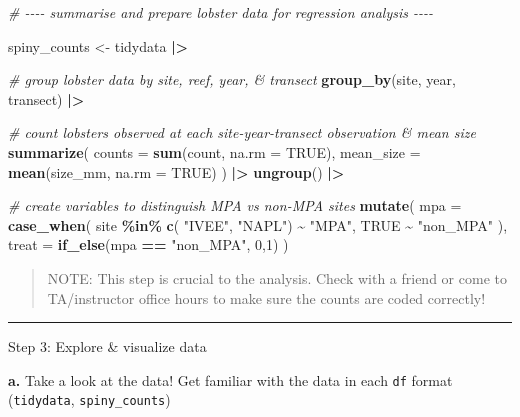 \documentclass[
]{article}
\newenvironment{Shaded}{\begin{snugshade}}{\end{snugshade}}
\newcommand{\AttributeTok}[1]{\textcolor[rgb]{0.13,0.29,0.53}{#1}}
\newcommand{\CommentTok}[1]{\textcolor[rgb]{0.56,0.35,0.01}{\textit{#1}}}
\newcommand{\ConstantTok}[1]{\textcolor[rgb]{0.56,0.35,0.01}{#1}}
\newcommand{\DecValTok}[1]{\textcolor[rgb]{0.00,0.00,0.81}{#1}}
\newcommand{\FunctionTok}[1]{\textcolor[rgb]{0.13,0.29,0.53}{\textbf{#1}}}
\newcommand{\NormalTok}[1]{#1}
\newcommand{\OtherTok}[1]{\textcolor[rgb]{0.56,0.35,0.01}{#1}}
\newcommand{\SpecialCharTok}[1]{\textcolor[rgb]{0.81,0.36,0.00}{\textbf{#1}}}
\newcommand{\StringTok}[1]{\textcolor[rgb]{0.31,0.60,0.02}{#1}}
\begin{document}
\begin{Shaded}
\begin{Highlighting}[]
\CommentTok{\# {-}{-}{-}{-} summarise and prepare lobster data for regression analysis {-}{-}{-}{-}}

\NormalTok{spiny\_counts }\OtherTok{\textless{}{-}}\NormalTok{ tidydata }\SpecialCharTok{|\textgreater{}}
    
    \CommentTok{\# group lobster data by site, reef, year, \& transect}
    \FunctionTok{group\_by}\NormalTok{(site, year, transect) }\SpecialCharTok{|\textgreater{}}
    
    \CommentTok{\# count lobsters observed at each site{-}year{-}transect observation \& mean size}
    \FunctionTok{summarize}\NormalTok{(}
        \AttributeTok{counts =} \FunctionTok{sum}\NormalTok{(count, }\AttributeTok{na.rm =} \ConstantTok{TRUE}\NormalTok{),}
        \AttributeTok{mean\_size =} \FunctionTok{mean}\NormalTok{(size\_mm, }\AttributeTok{na.rm =} \ConstantTok{TRUE}\NormalTok{)}
\NormalTok{    ) }\SpecialCharTok{|\textgreater{}}
    \FunctionTok{ungroup}\NormalTok{() }\SpecialCharTok{|\textgreater{}}
    
    \CommentTok{\# create variables to distinguish MPA vs non{-}MPA sites}
    \FunctionTok{mutate}\NormalTok{(}
        \AttributeTok{mpa =} \FunctionTok{case\_when}\NormalTok{(}
\NormalTok{            site }\SpecialCharTok{\%in\%} \FunctionTok{c}\NormalTok{( }\StringTok{"IVEE"}\NormalTok{,  }\StringTok{"NAPL"}\NormalTok{) }\SpecialCharTok{\textasciitilde{}} \StringTok{"MPA"}\NormalTok{,}
            \ConstantTok{TRUE} \SpecialCharTok{\textasciitilde{}} \StringTok{"non\_MPA"}
\NormalTok{            ),}
        \AttributeTok{treat =} \FunctionTok{if\_else}\NormalTok{(mpa }\SpecialCharTok{==} \StringTok{"non\_MPA"}\NormalTok{, }\DecValTok{0}\NormalTok{,}\DecValTok{1}\NormalTok{)}
\NormalTok{    )}
\end{Highlighting}
\end{Shaded}

\begin{quote}
NOTE: This step is crucial to the analysis. Check with a friend or come
to TA/instructor office hours to make sure the counts are coded
correctly!
\end{quote}

\begin{center}\rule{0.5\linewidth}{0.5pt}\end{center}

Step 3: Explore \& visualize data

\textbf{a.} Take a look at the data! Get familiar with the data in each
\texttt{df} format (\texttt{tidydata}, \texttt{spiny\_counts})
\end{document}
